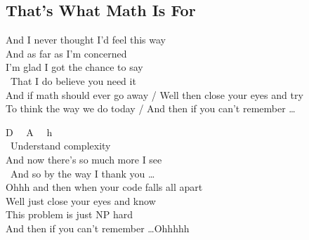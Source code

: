 \subsection{That's What Math Is For}
And I never thought I'd feel this way  \\
And as far as I'm concerned \\
I'm glad I got the chance to say \\
 \ That I do believe you need it \\

And if math should ever go away / Well then close your eyes and try \\
To think the way we do today / And then if you can't remember \ldots \\


\textcolor{\chordcolor}{D \ \ A \ \ h}  \\
 \ Understand complexity \\
And now there's so much more I see \\
 \ And so by the way I thank you \ldots \\

Ohhh and then when your code falls all apart \\
Well just close your eyes and know \\
This problem is just NP hard \\
And then if you can't remember \ldots Ohhhhh \\


\vspace*{-1cm}

